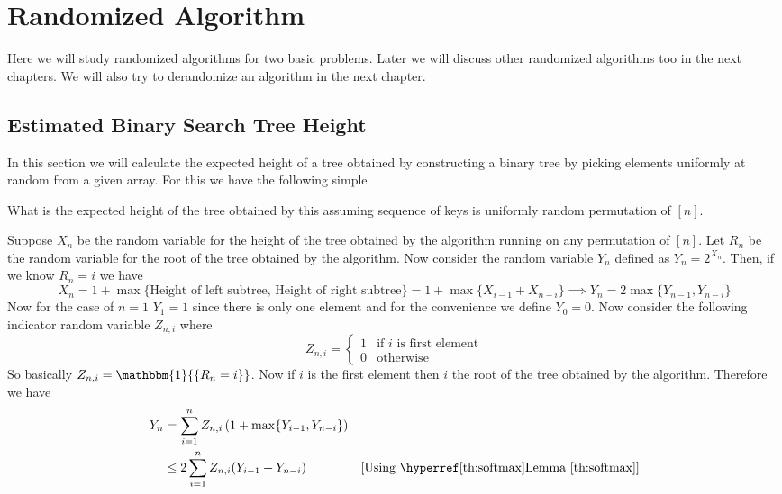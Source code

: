 \chapter{Randomized Algorithm}
Here we will study randomized algorithms for two basic problems. Later we will discuss other randomized algorithms too in the next chapters. We will also try to derandomize an algorithm in the next chapter.
\section{Estimated Binary Search Tree Height}
In this section we will calculate the expected height of a tree obtained by constructing a binary tree by picking elements uniformly at random from a given array. For this we have the following simple 

\begin{algorithm}
\DontPrintSemicolon{}
\caption{Simple Intersection Algorithm}
\end{algorithm}

\begin{question}{}{}
	What is the expected height of the tree obtained by this  assuming sequence of keys is uniformly random permutation of $[n]$.
\end{question}

Suppose $X_n$ be the random variable for the height of the tree obtained by the algorithm running on any permutation of $[n]$. Let $R_n$ be the random variable for the root of the tree obtained by the algorithm. Now consider the random variable $Y_n$ defined as $Y_n=2^{X_n}$. Then, if we know $R_n=i$ we have  $$X_n=1+\max\{\text{Height of left subtree, Height of right subtree}\}=1+\max\{X_{i-1}+X_{n-i}\}\implies Y_n=2\max\{Y_{n-1},Y_{n-i}\}$$Now for the case of $n=1$ $Y_1=1$  since there is only one element and for the convenience we define $Y_0=0$. Now consider the following indicator random variable $Z_{n,i}$ where $$Z_{n,i}=\begin{cases}
	1 & \text{if $i$ is first element}\\ 0 & \text{otherwise}
\end{cases}$$So basically $Z_{n,i}=\mathbbm{1}{\{R_n=i\}}$. Now if $i$ is the first element then $i$ the root of the tree obtained by the algorithm. Therefore we have \begin{align*}
Y_n &=\sum\limits_{i=1}^n Z_{n,i}\lt(1+\max\{Y_{i-1},Y_{n-i}\}\rt)\\
& \leq 2\sum\limits_{i=1}^nZ_{n,i}(Y_{i-1}+Y_{n-i}) & [\text{Using \lmref{softmax}}]
\end{align*}

